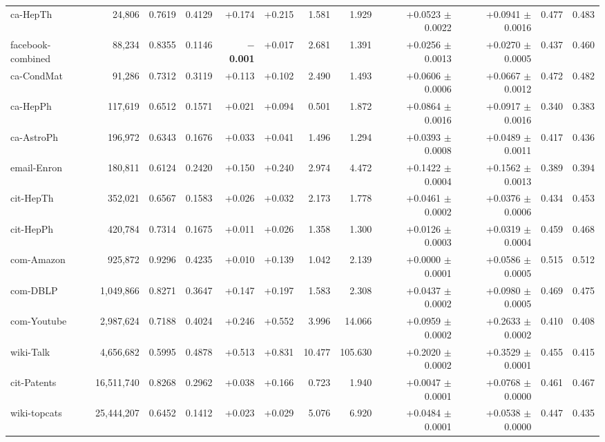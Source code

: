 \begin{table}[t]
\begin{tabular}{lrrrrrrrrrrr}
ca-HepTh & 24,806 & 0.7619 & 0.4129 & +0.174 & +0.215 & 1.581 & 1.929 & +0.0523 $\pm$ 0.0022 & +0.0941 $\pm$ 0.0016 & 0.477 & 0.483 \\
facebook-combined & 88,234 & 0.8355 & 0.1146 & \textbf{$-$0.001} & +0.017 & 2.681 & 1.391 & +0.0256 $\pm$ 0.0013 & +0.0270 $\pm$ 0.0005 & 0.437 & 0.460 \\
ca-CondMat & 91,286 & 0.7312 & 0.3119 & +0.113 & +0.102 & 2.490 & 1.493 & +0.0606 $\pm$ 0.0006 & +0.0667 $\pm$ 0.0012 & 0.472 & 0.482 \\
ca-HepPh & 117,619 & 0.6512 & 0.1571 & +0.021 & +0.094 & 0.501 & 1.872 & +0.0864 $\pm$ 0.0016 & +0.0917 $\pm$ 0.0016 & 0.340 & 0.383 \\
ca-AstroPh & 196,972 & 0.6343 & 0.1676 & +0.033 & +0.041 & 1.496 & 1.294 & +0.0393 $\pm$ 0.0008 & +0.0489 $\pm$ 0.0011 & 0.417 & 0.436 \\
email-Enron & 180,811 & 0.6124 & 0.2420 & +0.150 & +0.240 & 2.974 & 4.472 & +0.1422 $\pm$ 0.0004 & +0.1562 $\pm$ 0.0013 & 0.389 & 0.394 \\
cit-HepTh & 352,021 & 0.6567 & 0.1583 & +0.026 & +0.032 & 2.173 & 1.778 & +0.0461 $\pm$ 0.0002 & +0.0376 $\pm$ 0.0006 & 0.434 & 0.453 \\
cit-HepPh & 420,784 & 0.7314 & 0.1675 & +0.011 & +0.026 & 1.358 & 1.300 & +0.0126 $\pm$ 0.0003 & +0.0319 $\pm$ 0.0004 & 0.459 & 0.468 \\
com-Amazon & 925,872 & 0.9296 & 0.4235 & +0.010 & +0.139 & 1.042 & 2.139 & +0.0000 $\pm$ 0.0001 & +0.0586 $\pm$ 0.0005 & 0.515 & 0.512 \\
com-DBLP & 1,049,866 & 0.8271 & 0.3647 & +0.147 & +0.197 & 1.583 & 2.308 & +0.0437 $\pm$ 0.0002 & +0.0980 $\pm$ 0.0005 & 0.469 & 0.475 \\
com-Youtube & 2,987,624 & 0.7188 & 0.4024 & +0.246 & +0.552 & 3.996 & 14.066 & +0.0959 $\pm$ 0.0002 & +0.2633 $\pm$ 0.0002 & 0.410 & 0.408 \\
wiki-Talk & 4,656,682 & 0.5995 & 0.4878 & +0.513 & +0.831 & 10.477 & 105.630 & +0.2020 $\pm$ 0.0002 & +0.3529 $\pm$ 0.0001 & 0.455 & 0.415 \\
cit-Patents & 16,511,740 & 0.8268 & 0.2962 & +0.038 & +0.166 & 0.723 & 1.940 & +0.0047 $\pm$ 0.0001 & +0.0768 $\pm$ 0.0000 & 0.461 & 0.467 \\
wiki-topcats & 25,444,207 & 0.6452 & 0.1412 & +0.023 & +0.029 & 5.076 & 6.920 & +0.0484 $\pm$ 0.0001 & +0.0538 $\pm$ 0.0000 & 0.447 & 0.435 \\
\bottomrule
\end{tabular}
\end{table}

